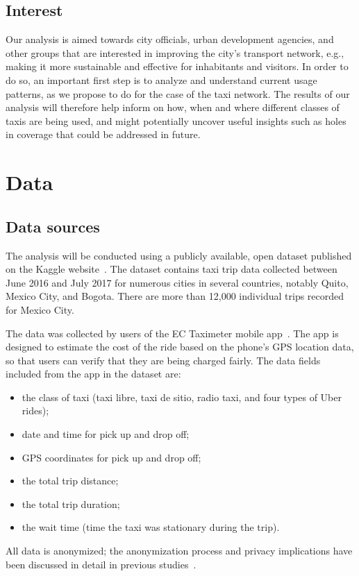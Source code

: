 \documentclass[10pt, a4paper, onecolumn]{article}
\begin{document}
\subsection{Interest}

Our analysis is aimed towards city officials, urban development agencies, and other groups that are interested in improving the city's transport network, e.g., making it more sustainable and effective for inhabitants and visitors. In order to do so, an important first step is to analyze and understand current usage patterns, as we propose to do for the case of the taxi network. The results of our analysis will therefore help inform on how, when and where different classes of taxis are being used, and might potentially uncover useful insights such as holes in coverage that could be addressed in future.

\section{Data}

\subsection{Data sources}

The analysis will be conducted using a publicly available, open dataset published on the Kaggle website~\cite{kaggle}. The dataset contains taxi trip data collected between June 2016 and July 2017 for numerous cities in several countries, notably Quito, Mexico City, and Bogota. There are more than 12,000 individual trips recorded for Mexico City.

The data was collected by users of the EC Taximeter mobile app~\cite{ec}. The app is designed to estimate the cost of the ride based on the phone's GPS location data, so that users can verify that they are being charged fairly. The data fields included from the app in the dataset are:
\begin{itemize}
\item the class of taxi (taxi libre, taxi de sitio, radio taxi, and four types of Uber rides);
\item date and time for pick up and drop off;
\item GPS coordinates for pick up and drop off;
\item the total trip distance;
\item the total trip duration;
\item the wait time (time the taxi was stationary during the trip).
\end{itemize}
All data is anonymized; the anonymization process and privacy implications have been discussed in detail in previous studies~\cite{privacy}.
\end{document}

